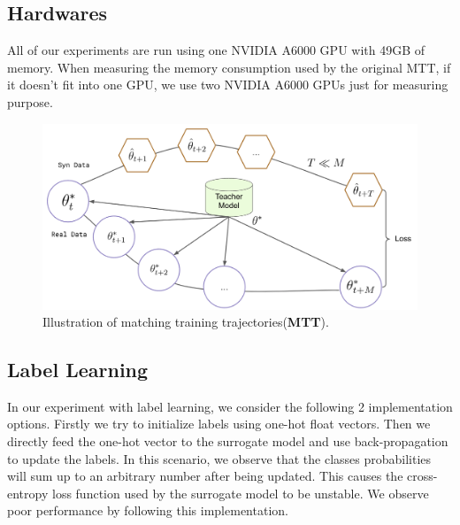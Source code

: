 \documentclass[10pt,twocolumn,letterpaper]{article}
\begin{document}
\subsection{Hardwares}
All of our experiments are run using one NVIDIA A6000 GPU with 49GB of memory. When measuring the memory consumption used by the original MTT, if it doesn't fit into one GPU, we use two NVIDIA A6000 GPUs just for measuring purpose.

\begin{figure}
    \centering
    \includegraphics[width=\linewidth]{images/overview_drawing.png}
    \caption{Illustration of matching training trajectories(\textbf{MTT}).}
    \label{fig:mtt}
\end{figure}


\subsection{Label Learning}
\label{sec.appendix.label_learning}
In our experiment with label learning, we consider the following 2 implementation options. Firstly we try to initialize labels using one-hot float vectors. Then we directly feed the one-hot vector to the surrogate model and use back-propagation to update the labels. In this scenario, we observe that the classes probabilities will sum up to an arbitrary number after being updated. This causes the cross-entropy loss function used by the surrogate model to be unstable. We observe poor performance by following this implementation.
\end{document}
